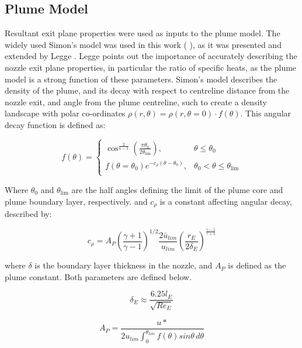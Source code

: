 \documentclass[journal]{new-aiaa}
\begin{document}
\subsection{Plume Model}

Resultant exit plane properties were used as inputs to the plume model. The widely used Simon's model was used in this work ( \cite{simonsEffectNozzleBoundary1972}), as it was presented and extended by Legge \cite{leggeModellingControlThruster1982}. Legge points out the importance of accurately describing the nozzle exit plane properties, in particular the ratio of specific heats, as the plume model is a strong function of these parameters. Simon's model describes the density of the plume, and its decay with respect to centreline distance from the nozzle exit, and angle from the plume centreline, such to create a density landscape with polar co-ordinates  $\rho (r, \theta) = \rho (r, \theta = 0) \cdot f(\theta)$. This angular decay function is defined as:

\begin{equation} 
f(\theta) =
\begin{cases} 
\cos^{\frac{2}{\kappa -1}} \left( \frac{\pi \theta_0}{2 \theta_{\lim}} \right), & \theta \leq \theta_0 \\
f(\theta=\theta_0) e^{-c_{\rho} (\theta - \theta_0)}, & \theta_0 < \theta \leq \theta_{\lim} \\
\end{cases}
\end{equation}

Where $\theta_0$ and $\theta_{\lim}$ are the half angles defining the limit of the plume core and plume boundary layer, respectively. and $c_{\rho}$ is a constant affecting angular decay, described by:

\begin{equation}
c_{\rho} = A_P \left( \frac{\gamma +1}{\gamma - 1} \right)^{1/2}  \frac{2 {\bar{u}}_{lim}}{u_{lim}} \left( \frac{r_E}{2 \delta_E} \right) ^{\frac{\gamma -1}{\gamma +1}}
\end{equation}

where $\delta$ is the boundary layer thickness in the nozzle, and $A_P$ is defined as the plume constant. Both parameters are defined below.

\begin{equation}
    \delta_E \approx \frac{6.25 l_E}{\sqrt{Re_E}}
\end{equation}

\begin{equation}
    A_P = \frac{u*}{2 u_{lim} \int_{0}^{\theta_{lim}} f(\theta) sin{\theta}  \,d\theta }
\end{equation}
\end{document}
